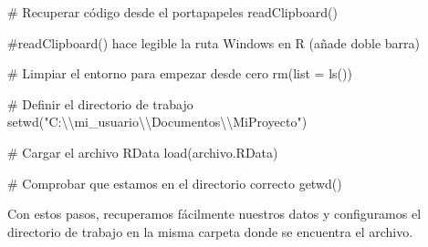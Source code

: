 \documentclass[
  letterpaper,
  DIV=11,
  numbers=noendperiod]{scrartcl}
\newenvironment{Shaded}{\begin{snugshade}}{\end{snugshade}}
\newcommand{\AttributeTok}[1]{\textcolor[rgb]{0.40,0.45,0.13}{#1}}
\newcommand{\CommentTok}[1]{\textcolor[rgb]{0.37,0.37,0.37}{#1}}
\newcommand{\FunctionTok}[1]{\textcolor[rgb]{0.28,0.35,0.67}{#1}}
\newcommand{\NormalTok}[1]{\textcolor[rgb]{0.00,0.23,0.31}{#1}}
\newcommand{\SpecialCharTok}[1]{\textcolor[rgb]{0.37,0.37,0.37}{#1}}
\newcommand{\StringTok}[1]{\textcolor[rgb]{0.13,0.47,0.30}{#1}}
\begin{document}
\begin{Shaded}
\begin{Highlighting}[]
\CommentTok{\# Recuperar código desde el portapapeles}
\FunctionTok{readClipboard}\NormalTok{()}

\CommentTok{\#readClipboard() hace legible la ruta Windows en R (añade doble barra)}

\CommentTok{\# Limpiar el entorno para empezar desde cero}
\FunctionTok{rm}\NormalTok{(}\AttributeTok{list =} \FunctionTok{ls}\NormalTok{())}

\CommentTok{\# Definir el directorio de trabajo}
\FunctionTok{setwd}\NormalTok{(}\StringTok{"C:}\SpecialCharTok{\textbackslash{}\textbackslash{}}\StringTok{mi\_usuario}\SpecialCharTok{\textbackslash{}\textbackslash{}}\StringTok{Documentos}\SpecialCharTok{\textbackslash{}\textbackslash{}}\StringTok{MiProyecto"}\NormalTok{)}

\CommentTok{\# Cargar el archivo RData}
\FunctionTok{load}\NormalTok{(archivo.RData)}

\CommentTok{\# Comprobar que estamos en el directorio correcto}
\FunctionTok{getwd}\NormalTok{()}
\end{Highlighting}
\end{Shaded}

Con estos pasos, recuperamos fácilmente nuestros datos y configuramos el
directorio de trabajo en la misma carpeta donde se encuentra el archivo.
\end{document}
